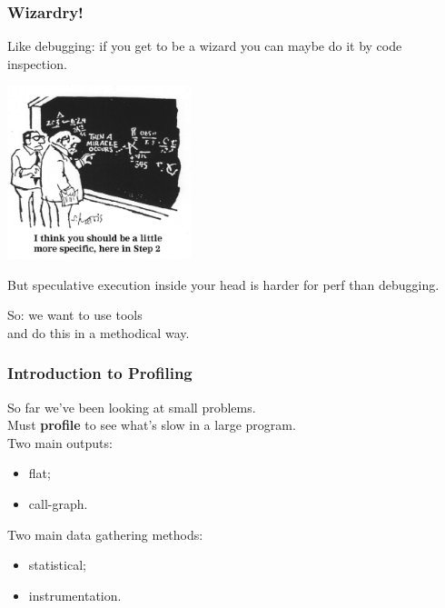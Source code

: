 \begin{frame}
\frametitle{Wizardry!}


\begin{changemargin}{2cm}
Like debugging: if you get to be a wizard you can maybe do it by code inspection.

\begin{center}
	\includegraphics[width=0.4\textwidth]{images/miracle.jpeg}
\end{center}

But speculative execution inside your head is harder for perf than debugging.

So: we want to use tools \\ 
and do this in a methodical way.
\end{changemargin}

\end{frame}


\begin{frame}
  \frametitle{Introduction to Profiling}



\begin{changemargin}{1.5cm}
    So far we've been looking at small problems.\\[1em]
    Must {\bf profile} to see what's slow in a
      large program.\\[1em]
    Two main outputs:
      \begin{itemize}
        \item flat;
        \item call-graph.
      \end{itemize}



    Two main data gathering methods:
      \begin{itemize}
        \item statistical;
        \item instrumentation.
      \end{itemize}
   \end{changemargin}
\end{frame}

